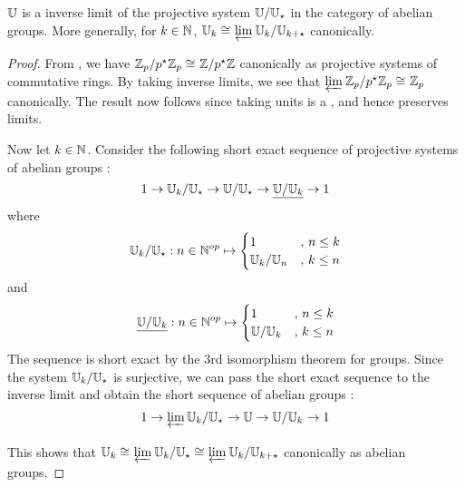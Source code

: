 \begin{prop}
  
  $\mathbb{U}$ is a inverse limit of the projective system $\mathbb{U}/\mathbb{U}_\star$
  in the category of abelian groups. 
  More generally, for $k \in \mathbb{N}$, 
  $\mathbb{U}_k \cong_{} \varprojlim_{{}} \mathbb{U}_k / \mathbb{U}_{k + \star}$ canonically.
\end{prop}
\begin{proof} 
  From , 
  we have $\mathbb{Z}_p/p^\star\mathbb{Z}_p \cong_{} \mathbb{Z}/p^\star\mathbb{Z}$ canonically as 
  projective systems of commutative rings. 
  By taking inverse limits, 
  we see that $\varprojlim_{{}} \mathbb{Z}_p/p^\star\mathbb{Z}_p \cong_{} \mathbb{Z}_p$ canonically. 
  The result now follows since taking units is a 
  ,
  and hence preserves limits. 

  Now let $k \in \mathbb{N}$. 
  Consider the following short exact sequence of projective systems 
  of abelian groups : 
  \[
    1 \to \mathbb{U}_k / \mathbb{U}_\star \to \mathbb{U} / \mathbb{U}_\star \to \underline{\mathbb{U} / \mathbb{U}_k} \to 1
  \]
  where \[
    \mathbb{U}_k / \mathbb{U}_\star : n \in \mathbb{N}^{op} \mapsto
    \begin{cases}
      1 &,\, n \leq k \\
      \mathbb{U}_k / \mathbb{U}_n &,\, k \leq n
    \end{cases}
  \]
  and \[
    \underline{\mathbb{U}/\mathbb{U}_k} : n\in\mathbb{N}^{op} \mapsto 
    \begin{cases}
      1 &,\, n \leq k \\
      \mathbb{U}/\mathbb{U}_k &,\, k \leq n
    \end{cases}
  \]
  The sequence is short exact by the 3rd isomorphism theorem for groups. 
  Since the system $\mathbb{U}_k/\mathbb{U}_\star$ is surjective, 
  we can pass the short exact sequence to the inverse limit and obtain 
  the short sequence of abelian groups : 
  \[
    1 \to \varprojlim_{{}} \mathbb{U}_k/\mathbb{U}_\star \to \mathbb{U} \to \mathbb{U}/\mathbb{U}_k \to 1
  \]
  This shows that
  $\mathbb{U}_k \cong_{} \varprojlim_{{}} \mathbb{U}_k/\mathbb{U}_\star \cong_{} \varprojlim_{{}} \mathbb{U}_k/\mathbb{U}_{k + \star} $ canonically
  as abelian groups.
\end{proof}

